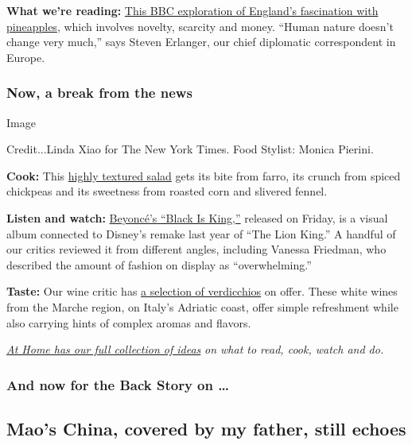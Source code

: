 \textbf{What we're reading:}
\href{https://www.bbc.com/news/uk-england-53432877}{This BBC exploration
of England's fascination with pineapples}, which involves novelty,
scarcity and money. ``Human nature doesn't change very much,'' says
Steven Erlanger, our chief diplomatic correspondent in Europe.

\hypertarget{now-a-break-from-the-news}{%
\subsubsection{Now, a break from the
news}\label{now-a-break-from-the-news}}

Image

Credit...Linda Xiao for The New York Times. Food Stylist: Monica
Pierini.

\textbf{Cook:} This
\href{https://www.nytimes3xbfgragh.onion/2020/07/31/dining/farro-corn-chickpea-salad-recipe.html}{highly
textured salad} gets its bite from farro, its crunch from spiced
chickpeas and its sweetness from roasted corn and slivered fennel.

\textbf{Listen and watch:}
\href{https://www.nytimes3xbfgragh.onion/2020/07/31/arts/music/beyonce-black-is-king.html}{Beyoncé's
``Black Is King,''} released on Friday, is a visual album connected to
Disney's remake last year of ``The Lion King.'' A handful of our critics
reviewed it from different angles, including Vanessa Friedman, who
described the amount of fashion on display as ``overwhelming.''

\textbf{Taste:} Our wine critic has
\href{https://www.nytimes3xbfgragh.onion/2020/07/30/dining/drinks/wine-school-verdicchio-di-matelica.html?action=click\&module=RelatedLinks\&pgtype=collection}{a
selection of verdicchios} on offer. These white wines from the Marche
region, on Italy's Adriatic coast, offer simple refreshment while also
carrying hints of complex aromas and flavors.

\href{https://www.nytimes3xbfgragh.onion/spotlight/at-home}{\emph{At
Home has our full collection of ideas}} \emph{on what to read, cook,
watch and do.}

\hypertarget{and-now-for-the-back-story-on-}{%
\subsubsection{And now for the Back Story on
\ldots{}}\label{and-now-for-the-back-story-on-}}

\hypertarget{maos-china-covered-by-my-father-still-echoes}{%
\subsection{Mao's China, covered by my father, still
echoes}\label{maos-china-covered-by-my-father-still-echoes}}

